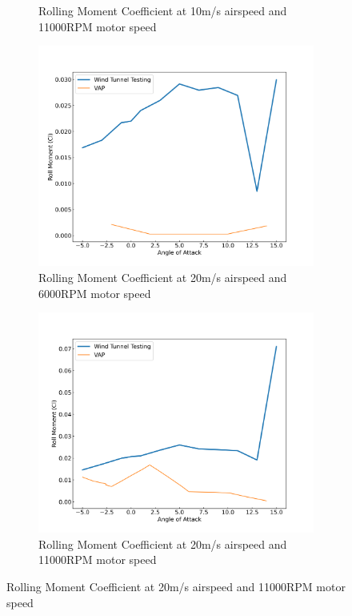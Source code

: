 \begin{figure}[H]
\begin{subfigure}[b]{0.467\textwidth}
        \caption{Rolling Moment Coefficient at 10m/s airspeed and 11000RPM motor speed}
        \label{fig:Missing2}
    \end{subfigure}
    \begin{subfigure}[b]{0.467\textwidth}
        \centering
        \includegraphics[width=\textwidth]{05_Results/VAP/tractor/Cl/20ms_6000RPM_Cl.png}
        \caption{Rolling Moment Coefficient at 20m/s airspeed and 6000RPM motor speed}
        \label{fig:VAP_Cl_20ms_6000}
    \end{subfigure}
    \begin{subfigure}[b]{0.467\textwidth}
        \centering
        \includegraphics[width=\textwidth]{05_Results/VAP/tractor/Cl/20ms_11000RPM_Cl.png}
        \caption{Rolling Moment Coefficient at 20m/s airspeed and 11000RPM motor speed}
        \label{fig:VAP_Cl_20ms_11000}
    \end{subfigure}
\end{figure}

